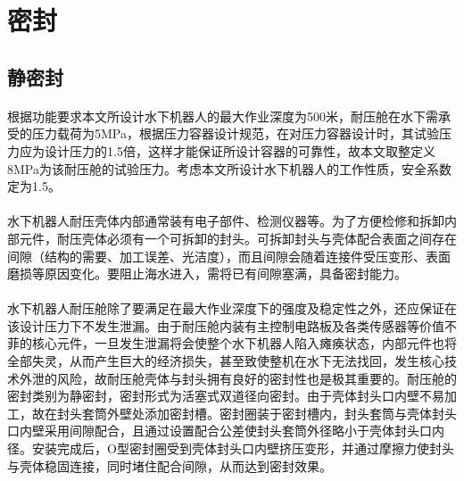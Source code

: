 \documentclass{ctexart}
\begin{document}
\section{密封}
\subsection{静密封}
\paragraph{}根据功能要求本文所设计水下机器人的最大作业深度为500米，耐压舱在水下需承受的压力载荷为5MPa，根据压力容器设计规范，在对压力容器设计时，其试验压力应为设计压力的1.5倍，这样才能保证所设计容器的可靠性，故本文取整定义8MPa为该耐压舱的试验压力。考虑本文所设计水下机器人的工作性质，安全系数定为1.5。
\paragraph{}水下机器人耐压壳体内部通常装有电子部件、检测仪器等。为了方便检修和拆卸内部元件，耐压壳体必须有一个可拆卸的封头。可拆卸封头与壳体配合表面之间存在间隙（结构的需要、加工误差、光洁度），而且间隙会随着连接件受压变形、表面磨损等原因变化。要阻止海水进入，需将已有间隙塞满，具备密封能力。
\paragraph{}水下机器人耐压舱除了要满足在最大作业深度下的强度及稳定性之外，还应保证在该设计压力下不发生泄漏。由于耐压舱内装有主控制电路板及各类传感器等价值不菲的核心元件，一旦发生泄漏将会使整个水下机器人陷入瘫痪状态，内部元件也将全部失灵，从而产生巨大的经济损失，甚至致使整机在水下无法找回，发生核心技术外泄的风险，故耐压舱壳体与封头拥有良好的密封性也是极其重要的。耐压舱的密封类别为静密封，密封形式为活塞式双道径向密封。由于壳体封头口内壁不易加工，故在封头套筒外壁处添加密封槽。密封圈装于密封槽内，封头套筒与壳体封头口内壁采用间隙配合，且通过设置配合公差使封头套筒外径略小于壳体封头口内径。安装完成后，O型密封圈受到壳体封头口内壁挤压变形，并通过摩擦力使封头与壳体稳固连接，同时堵住配合间隙，从而达到密封效果。
\end{document}
